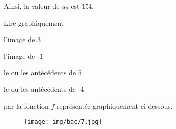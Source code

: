 \documentclass[answers]{exam}
\begin{document}
\begin{questions}
\begin{solution}
Ainsi, la valeur de $u_2$ est \(\boxed{154}\).
\end{solution}

\question[1] Lire graphiquement
\begin{compactenum}
\item l'image de 3
\item l'image de -1
\item le ou les antécédents de 5
\item le ou les antécédents de -4
\end{compactenum}
par la fonction $f$ représentée graphiquement ci-dessous.

\begin{figure}[H]
  \centering
  \texttt{[image: img/bac/7.jpg]}
\end{figure}

\end{questions}
\end{document}
